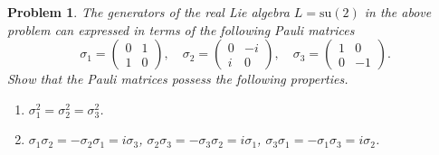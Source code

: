 \documentclass[UTF8,10pt,a4paper]{article}
\theoremstyle{Problem}
\newtheorem{prob}{Problem}
\theoremstyle{Solution}
\begin{document}
\begin{prob}
    The generators of the real Lie algebra $L=\text{su}(2)$ in the above problem can expressed in terms of the following Pauli matrices
    \[
        \sigma_1=\left(\begin{matrix}
            0&1\\
            1&0
        \end{matrix}\right),\quad\sigma_2=\left(\begin{matrix}
            0&-i\\
            i&0
        \end{matrix}\right),\quad\sigma_3=\left(\begin{matrix}
            1&0\\
            0&-1
        \end{matrix}\right).
    \]
    Show that the Pauli matrices possess the following properties.
    \begin{enumerate}
        \item[(a)] $\sigma_1^2=\sigma_2^2=\sigma_3^2$.
        \item[(b)] $\sigma_1\sigma_2=-\sigma_2\sigma_1=i\sigma_3$, $\sigma_2\sigma_3=-\sigma_3\sigma_2=i\sigma_1$, $\sigma_3\sigma_1=-\sigma_1\sigma_3=i\sigma_2$.
    \end{enumerate}
\end{prob}
\end{document}
